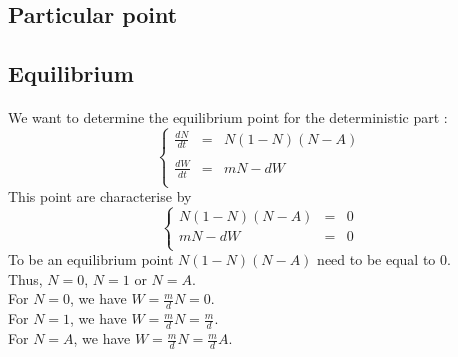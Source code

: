 \documentclass{article}
\begin{document}




\subsection{Particular point}
\label{equi}

\subsection{Equilibrium}

\paragraph{}
We want to determine the equilibrium point for the deterministic part :
\[
\left\lbrace
\begin{array}{rcl}
\frac{dN}{dt} & = & N(1-N)(N-A) \\
\\
\frac{dW}{dt} & = & mN -dW \\
\end{array}
\right.
\]
This point are characterise by
\[
\left\lbrace
\begin{array}{rcl}
N(1-N)(N-A) & = & 0\\
mN -dW & = & 0\\
\end{array}
\right.
\]
To be an equilibrium point $N(1-N)(N-A)$ need to be equal to $0$. \\
Thus, $N = 0$, $N = 1$ or $N = A$. \\
For $N = 0$, we have $W = \frac{m}{d}N = 0$. \\
For $N = 1$, we have $W = \frac{m}{d}N = \frac{m}{d}$. \\
For $N = A$, we have $W = \frac{m}{d}N = \frac{m}{d}A$. \\
\end{document}
